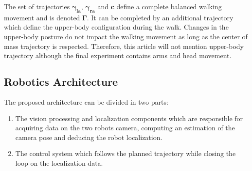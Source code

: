The set of trajectories $\mathbf{\gamma_{\text{la}}}$,
$\mathbf{\gamma_{\text{ra}}}$ and $\mathbf{c}$ define a complete
balanced walking movement and is denoted $\mathbf{\Gamma}$. It can be
completed by an additional trajectory which define the upper-body
configuration during the walk. Changes in the upper-body posture do
not impact the walking movement as long as the center of mass
trajectory is respected. Therefore, this article will not mention
upper-body trajectory although the final experiment contains arms and
head movement.

\subsection{Robotics Architecture}

The proposed architecture can be divided in two parts:
\begin{enumerate}
\item The vision processing and localization components which are
  responsible for acquiring data on the two robots camera, computing
  an estimation of the camera pose and deducing the robot
  localization.
\item The control system which follows the planned trajectory while
  closing the loop on the localization data.
\end{enumerate}

